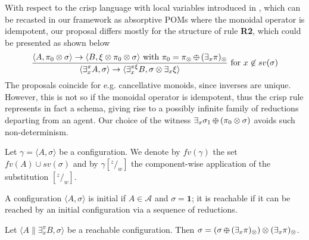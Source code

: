 \documentclass{llncs}
\def\1{{\mathbf 1}}
\def\1{{\mathbf 1}}
\def\odiv{\, {\ominus\hspace{-7.7pt} \div} \,}
\begin{document}
\begin{remark}
\label{crisp}
With respect to the crisp language with local variables introduced in \cite{pippo},
which can be recasted in our framework as absorptive POMs
where the monoidal operator is idempotent,
our proposal differs mostly for the structure of rule \mbox{\bf R2}, which could 
be presented as shown below
   $$\frac {\displaystyle \langle A, \pi_0 \otimes \sigma \rangle
    \to \langle B, \xi \otimes \pi_0 \otimes \sigma \rangle \text{ with } \pi_0 = \pi_\otimes \odiv (\exists_x \pi)_\otimes}
    {\displaystyle\langle \exists^{\pi}_x A,\sigma\rangle \to \langle 
    \exists^{\pi \xi}_x B, \sigma \otimes \exists_x \xi
    \rangle} \text{ for } x \not \in sv(\sigma)$$
The proposals coincide for e.g. cancellative monoids, since inverses are unique.
However, this is not so if the monoidal operator is idempotent, thus 
the crisp rule represents in fact a schema, giving rise to a possibly infinite
family of reductions departing from an agent. Our choice of the witness 
$\exists_x \sigma_1 \odiv (\pi_0 \otimes \sigma)$ avoids such non-determinism.
\end{remark}

Let $\gamma = \langle A, \sigma \rangle$ be a configuration.
%
We denote by $fv(\gamma)$ the set $fv(A) \cup sv(\sigma)$ and by
$\gamma[^z/_w]$ the component-wise application of the substitution $[^z/_w]$.

\begin{definition}
A configuration $\langle A, \sigma \rangle$ is initial if $A\in \mathcal{A}$
and $\sigma = \1$; it is reachable if it can be reached by an initial configuration 
via a sequence of reductions.
\end{definition}

\begin{lemma}[On monotonicity, II]
\label{mono2}
Let $\langle A \parallel \exists_x^\pi B, \sigma \rangle$ 
be a reachable configuration.
Then $\sigma = (\sigma \odiv (\exists_x \pi)_\otimes) \otimes (\exists_x \pi)_\otimes$.
\end{lemma}
\end{document}
